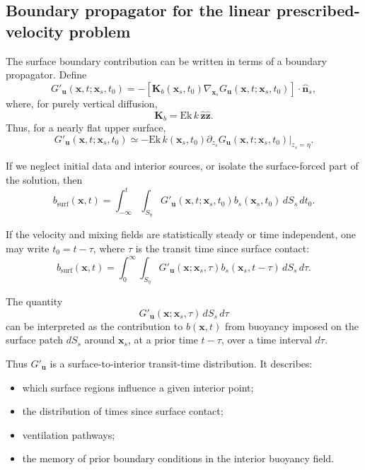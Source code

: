 \documentclass[10pt]{amsart}
\begin{document}
\subsection{Boundary propagator for the linear prescribed-velocity problem}

The surface boundary contribution can be written in terms of a boundary propagator. Define
\begin{equation}
G'_{\mathbf u}(\mathbf x,t;\mathbf x_s,t_0)
=
-
\left[
\mathbf K_b(\mathbf x_s,t_0)
\nabla_{\mathbf x_s}G_{\mathbf u}(\mathbf x,t;\mathbf x_s,t_0)
\right]\cdot \hat{\mathbf n}_s,
\end{equation}
where, for purely vertical diffusion,
\begin{equation}
\mathbf K_b
=
\mathrm{Ek}\,k\,\hat{\mathbf z}\hat{\mathbf z}.
\end{equation}
Thus, for a nearly flat upper surface,
\begin{equation}
G'_{\mathbf u}(\mathbf x,t;\mathbf x_s,t_0)
\simeq
-\mathrm{Ek}\,k(\mathbf x_s,t_0)
\partial_{z_s}G_{\mathbf u}(\mathbf x,t;\mathbf x_s,t_0)
\bigg|_{z_s=\eta}.
\end{equation}

If we neglect initial data and interior sources, or isolate the surface-forced part of the solution, then
\begin{equation}
b_{\mathrm{surf}}(\mathbf x,t)
=
\int_{-\infty}^{t}\int_{S_\eta}
G'_{\mathbf u}(\mathbf x,t;\mathbf x_s,t_0)
b_s(\mathbf x_s,t_0)
\,dS_s\,dt_0.
\end{equation}

If the velocity and mixing fields are statistically steady or time independent, one may write \(t_0=t-\tau\), where \(\tau\) is the transit time since surface contact:
\begin{equation}
b_{\mathrm{surf}}(\mathbf x,t)
=
\int_0^\infty \int_{S_\eta}
G'_{\mathbf u}(\mathbf x;\mathbf x_s,\tau)
b_s(\mathbf x_s,t-\tau)
\,dS_s\,d\tau.
\end{equation}

The quantity
\begin{equation}
G'_{\mathbf u}(\mathbf x;\mathbf x_s,\tau)\,dS_s\,d\tau
\end{equation}
can be interpreted as the contribution to \(b(\mathbf x,t)\) from buoyancy imposed on the surface patch \(dS_s\) around \(\mathbf x_s\), at a prior time \(t-\tau\), over a time interval \(d\tau\).

Thus \(G'_{\mathbf u}\) is a surface-to-interior transit-time distribution. It describes:
\begin{itemize}
\item which surface regions influence a given interior point;
\item the distribution of times since surface contact;
\item ventilation pathways;
\item the memory of prior boundary conditions in the interior buoyancy field.
\end{itemize}
\end{document}
